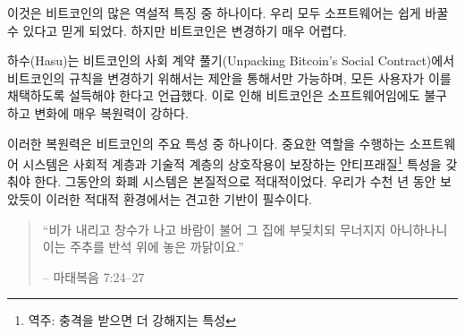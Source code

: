 \begin{comment}
	This is one of the many paradoxical properties of Bitcoin. We all came
	to believe that anything which is software can be changed easily. But
	the nature of the beast makes changing it bloody hard.
\end{comment}
이것은 비트코인의 많은 역설적 특징 중 하나이다.
우리 모두 소프트웨어는 쉽게 바꿀 수 있다고 믿게 되었다.
하지만 비트코인은 변경하기 매우 어렵다. 
	
\begin{comment}
	As Hasu beautifully shows in Unpacking Bitcoin's Social
	Contract~\cite{social-contract}, changing the rules of Bitcoin is only possible
	by \textit{proposing} a change, and consequently \textit{convincing} all users
	of Bitcoin to adopt this change. This makes Bitcoin very resilient to change,
	even though it is software.
\end{comment}
하수(Hasu)는 비트코인의 사회 계약 풀기(Unpacking Bitcoin's Social Contract)\cite{social-contract}에서
비트코인의 규칙을 변경하기 위해서는 제안을 통해서만 가능하며, 모든 사용자가 이를 채택하도록 설득해야 한다고 언급했다.
이로 인해 비트코인은 소프트웨어임에도 불구하고 변화에 매우 복원력이 강하다.

\begin{comment}
	This resilience is one of the most important properties of Bitcoin.
	Critical software systems have to be antifragile, which is what the
	interplay of Bitcoin's social layer and its technical layer guarantees.
	Monetary systems are adversarial by nature, and as we have known for
	thousands of years solid foundations are essential in an adversarial
	environment.
\end{comment}
이러한 복원력은 비트코인의 주요 특성 중 하나이다.
중요한 역할을 수행하는 소프트웨어 시스템은 사회적 계층과 기술적 계층의 상호작용이 보장하는 
안티프래질\footnote{역주: 충격을 받으면 더 강해지는 특성} 특성을 갖춰야 한다.
그동안의 화폐 시스템은 본질적으로 적대적이었다.
우리가 수천 년 동안 보았듯이 이러한 적대적 환경에서는 견고한 기반이 필수이다.
	
\begin{quotation}\begin{samepage}
	\begin{comment}
		\enquote{The rain came down, the floods came, and the winds blew, and beat on
			that house; and it didn't fall, for it was founded on the rock.}
		\begin{flushright} -- Matthew 7:24--27
		\end{comment}
		\enquote{비가 내리고 창수가 나고 바람이 불어 그 집에 부딪치되 무너지지 아니하나니 이는 주추를 반석 위에 놓은 까닭이요.}
		\begin{flushright} -- 마태복음 7:24--27
\end{flushright}\end{samepage}\end{quotation}
		
